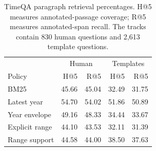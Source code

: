 \begin{table}[t]
\centering
\small
\setlength{\tabcolsep}{3.5pt}
\begin{tabular}{lrrrr}
\toprule
& \multicolumn{2}{c}{Human} & \multicolumn{2}{c}{Templates} \\
Policy & H@5 & R@5 & H@5 & R@5 \\
\midrule
BM25 & 45.66 & 45.04 & 32.49 & 31.75 \\
Latest year & 54.70 & 54.02 & 51.86 & 50.89 \\
Year envelope & 49.16 & 48.33 & 34.44 & 33.67 \\
Explicit range & 44.10 & 43.53 & 32.11 & 31.39 \\
Range support & 44.58 & 44.00 & 38.50 & 37.63 \\
\bottomrule
\end{tabular}
\caption{TimeQA paragraph retrieval percentages. H@5 measures annotated-passage coverage; R@5 measures annotated-span recall. The tracks contain 830 human questions and 2,613 template questions.}
\label{tab:natural}
\end{table}
